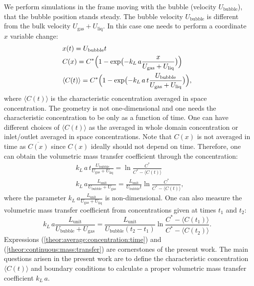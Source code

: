 \documentclass{article}
\newcommand{\beq}{\begin{equation}}
\newcommand{\feq}{\end{equation}}
\newcommand{\beqal}{\begin{equation}\begin{aligned}}
\newcommand{\feqal}{\end{aligned}\end{equation}}
\newcommand{\vol}{k_L\,a}
\newcommand{\lunit}{L_{\mathrm{unit}}}
\newcommand{\ububble}{U_{\mathrm{bubble}}}
\newcommand{\uliq}{U_{\mathrm{liq}}}
\newcommand{\ugas}{U_{\mathrm{gas}}}
\newcommand{\cstar}{C^{*}}
\newcommand{\volnondim}{\vol \frac{\lunit}{\ububble+\ugas}}
\begin{document}
We perform simulations in the frame moving with the bubble (velocity
$\ububble$), that the bubble position stands steady. The bubble velocity $\ububble$ is
different from the bulk velocity $\ugas+\uliq$. In this case one needs to perform a coordinate $x$
variable change:
\beqal
\label{theor:average:concentration:time}
&x(t)=\ububble t\\
&C(x)=\cstar \Bigl(1-\exp\bigl(-\vol \frac{x}{\ugas+\uliq}\bigr)\Bigr)\\
&\langle C(t)\rangle=\cstar \Bigl(1-\exp\bigl(-\vol\, t \frac{\ububble}{\ugas+\uliq}\bigr)\Bigr),
\feqal
where $\langle C(t)\rangle$ is the characteristic concentration averaged in space
concentration. The geometry is not one-dimensional and one needs the characteristic concentration
to be only as a function of time. One can have different choices of
$\langle C(t) \rangle$ as the averaged in whole domain concentration or inlet/outlet averaged in
space concentrations.  Note that $C(x)$ is not averaged in time as $\overline{C(x)}$ since $C(x)$
ideally should not depend on time. 
Therefore, one can obtain the volumetric mass transfer coefficient through the concentration:
\beqal
\label{theor:one:concentration:time}
&\vol\, t \frac{\ububble}{\ugas+\uliq}=\ln \frac{\cstar}{\cstar-\langle C(t)\rangle}\\
&\volnondim=\frac{\lunit}{\ububble t}\ln \frac{\cstar}{\cstar-\langle C(t) \rangle},
\feqal
where the parameter $\vol \frac{\lunit}{\ugas+\uliq}$ is non-dimensional. One can also measure the
volumetric mass transfer coefficient from concentrations given at times $t_1$ and $t_2$:
\beq
\label{theor:continuous:mass:transfer}
\volnondim=\frac{\lunit}{\ububble
(t_2-t_1)}\ln\frac{C^{*}-\langle C(t_1) \rangle}{C^{*}-\langle C(t_2) \rangle}.
\feq
Expressions (\ref{theor:average:concentration:time}) and (\ref{theor:continuous:mass:transfer}) are
cornerstones of the present work. The main questions arisen in the present work are to define the
characteristic concentration $\langle C(t) \rangle$ and  boundary conditions to calculate a proper
volumetric mass transfer coefficient
$\vol$. 
  
\end{document}
